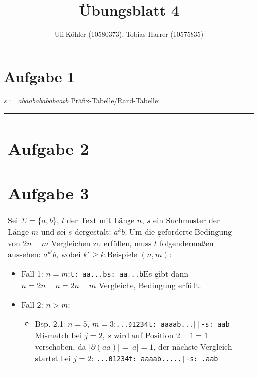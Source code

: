 \documentclass[a4paper,10pt,oneside,leqno]{scrartcl}
\title{Übungsblatt 4}
\author{Uli Köhler (10580373), Tobias Harrer (10575835)}
\begin{document}
\maketitle

\section*{Aufgabe 1}
$s := abaababababaabb$
Präfix-Tabelle/Rand-Tabelle:
\begin{tabular}{l|c|c}
\textbf{}


\section*{Aufgabe 2}
\section*{Aufgabe 3}
Sei $\Sigma = \{a,b\}$, $t$ der Text mit Länge $n$, $s$ ein Suchmuster der Länge $m$ und sei $s$ dergestalt: $a^kb$. Um die geforderte
Bedingung von $2n -m$ Vergleichen zu erfüllen, muss $t$ folgendermaßen aussehen: $a^{k'}b$, wobei $k'\geq k$.\newline Beispiele $(n,m)$:\newline
\begin{itemize}
 \item Fall 1: $n=m$:\newline \texttt{t: aa...b}\newline \texttt{s: aa...b}\newline Es gibt dann $n= 2n-n = 2n-m$ Vergleiche, Bedingung erfüllt.
 \item Fall 2: $n>m$:\newline
\begin{itemize}
 \item Bsp. 2.1: $n=5$, $m=3$:\newline \texttt{...01234}\newline \texttt{t: aaaab}\newline \texttt{...||-}\newline\texttt{s: aab} \newline
 Mismatch bei $j=2$, $s$ wird auf Position $2-1=1$ verschoben, da $|\partial(aa)| = |a| = 1$, der nächste Vergleich startet bei $j=2$:\newline
 \texttt{...01234}\newline \texttt{t: aaaab}\newline \texttt{.....|-}\newline\texttt{s: .aab} \newline

\end{itemize}
\end{itemize}
\end{tabular}
\end{document}
